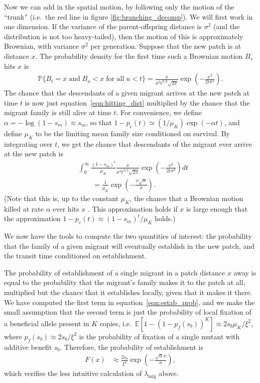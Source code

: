 \documentclass{article}
\renewcommand{\P}{\mathbb{P}}
\newcommand{\E}{\mathbb{E}}
\newcommand{\deq}{\stackrel{\scriptscriptstyle{d}}{=}}
\newcommand{\migrate}{\lambda_\text{mig}}
\begin{document}
Now we can add in the spatial motion, by following only the motion of the ``trunk''
(i.e.\ the red line in figure \ref{fig:branching_decomp}).
We will first work in one dimension.
If the variance of the parent-offspring distance is $\sigma^2$ (and the distribution is not too heavy-tailed),
then the motion of this is approximately Brownian, with variance $\sigma^2$ per generation.
Suppose that the new patch is at distance $x$.
The probability density for the first time such a Brownian motion $B_s$ hits $x$ is
\citep[XXX]{feller}
\begin{align} \label{eqn:hitting_dist}
  \P\{ B_t=x \;\mbox{and} \; B_u<x \;\mbox{for all}\; u<t\} =  \frac{x}{\sigma^3 t^{3/2}\sqrt{2\pi}} \exp\left(-\frac{x^2}{2t\sigma^2}\right) .
\end{align}
The chance that the descendants of a given migrant arrives at the new patch at time $t$
is now just equation~\eqref{eqn:hitting_dist} multiplied by the chance that 
the migrant family is still alive at time $t$.
For convenience, we define $\alpha = - \log(1-s_m) \approx s_m$,
so that $1-p_e(t) \simeq (1/\mu_K) \exp(-\alpha t)$,
and define $\mu_K$ to be the limiting mean family size conditioned on survival.
By integrating over $t$, we get the chance that descendants of the migrant ever arrive at the new patch is
\begin{align} \label{eqn:estab_prob}
  & \int_0^\infty \frac{(1-s_m)^t}{\mu_K} \frac{x}{\sigma^3 t^{3/2}\sqrt{2\pi}} \exp\left(-\frac{x^2}{2t\sigma^2}\right)  dt \\
  & \qquad = \frac{1}{\mu_K} \exp\left( - \frac{ x \sqrt{\alpha}}{\sigma} \right) .
\end{align}
(Note that this is, up to the constant $\mu_K$, the chance that a Brownian motion killed at rate $\alpha$
ever hits $x$ \citep{feller}.
This approximation holds if $x$ is large enough that the approximation $1-p_e(t) \approx (1-s_m)^t/\mu_K$ holds.)

We now have the tools to compute the two quantities of interest:
the probability that the family of a given migrant will eventually establish in the new patch,
and the transit time conditioned on establishment.

The probability of establishment of a single migrant in a patch distance $x$ away
is equal to the probability that the migrant's family makes it to the patch at all,
multiplied but the chance that it establishes locally, given that it makes it there.
We have computed the first term in equation~\eqref{eqn:estab_prob},
and we make the small assumption that the second term is just the probability of local fixation
of a beneficial allele present in $K$ copies,
i.e.~$\E[1-(1-p_f(s_b))^K] \approx 2 s_b \mu_K/\xi^2$,
where $p_f(s_b) \approx 2s_b/\xi^2$ is the probability of fixation of a single mutant with additive benefit $s_b$.
Therefore, the probability of establishment is
\begin{align}
  F(x) &\approx \frac{2s_b}{\xi^2} \exp\left( - \frac{\sqrt{\alpha} x}{\sigma} \right) ,
\end{align}
which verifies the less intuitive calculation of $\migrate$ above.
\end{document}
